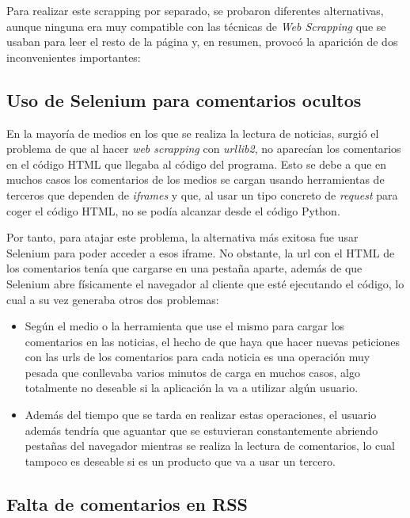 Para realizar este scrapping por separado, se probaron diferentes alternativas, aunque ninguna era muy compatible con las técnicas de \emph{Web Scrapping} que se usaban para leer el resto de la página y, en resumen, provocó la aparición de dos inconvenientes importantes:

\subsection{Uso de Selenium para comentarios ocultos}

En la mayoría de medios en los que se realiza la lectura de noticias, surgió el problema de que al hacer \emph{web scrapping} con \emph{urllib2}, no aparecían los comentarios en el código HTML que llegaba al código del programa. Esto se debe a que en muchos casos los comentarios de los medios se cargan usando herramientas de terceros que dependen de \emph{iframes} y que, al usar un tipo concreto de \emph{request} para coger el código HTML, no se podía alcanzar desde el código Python. 

Por tanto, para atajar este problema, la alternativa más exitosa fue usar Selenium para poder acceder a esos iframe. No obstante, la url con el HTML de los comentarios tenía que cargarse en una pestaña aparte, además de que Selenium abre físicamente el navegador al cliente que esté ejecutando el código, lo cual a su vez generaba otros dos problemas:

\begin{itemize}

\item Según el medio o la herramienta que use el mismo para cargar los comentarios en las noticias, el hecho de que haya que hacer nuevas peticiones con las urls de los comentarios para cada noticia es una operación muy pesada que conllevaba varios minutos de carga en muchos casos, algo totalmente no deseable si la aplicación la va a utilizar algún usuario.

\item Además del tiempo que se tarda en realizar estas operaciones, el usuario además tendría que aguantar que se estuvieran constantemente abriendo pestañas del navegador mientras se realiza la lectura de comentarios, lo cual tampoco es deseable si es un producto que va a usar un tercero.

\end{itemize}
 


\subsection{Falta de comentarios en RSS}

